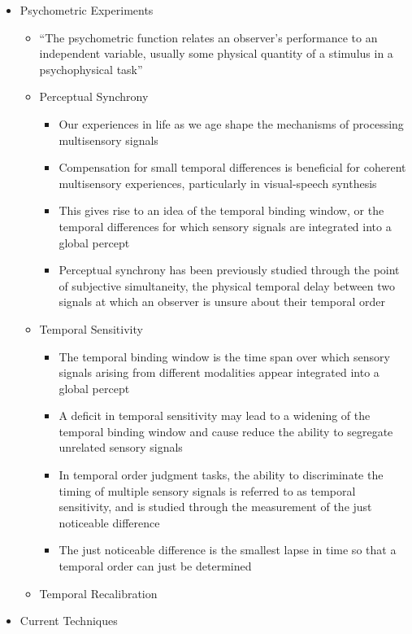 \documentclass[
]{article}
\providecommand{\tightlist}{%
  \setlength{\itemsep}{0pt}\setlength{\parskip}{0pt}}
\begin{document}
\begin{itemize}
\tightlist
\item
  Psychometric Experiments

  \begin{itemize}
  \tightlist
  \item
    ``The psychometric function relates an observer's performance to an independent variable, usually some physical quantity of a stimulus in a psychophysical task'' \citep{Wichmann2001a}
  \item
    Perceptual Synchrony

    \begin{itemize}
    \tightlist
    \item
      Our experiences in life as we age shape the mechanisms of processing multisensory signals
    \item
      Compensation for small temporal differences is beneficial for coherent multisensory experiences, particularly in visual-speech synthesis
    \item
      This gives rise to an idea of the temporal binding window, or the temporal differences for which sensory signals are integrated into a global percept
    \item
      Perceptual synchrony has been previously studied through the point of subjective simultaneity, the physical temporal delay between two signals at which an observer is unsure about their temporal order \citep{stone2001}
    \end{itemize}
  \item
    Temporal Sensitivity

    \begin{itemize}
    \tightlist
    \item
      The temporal binding window is the time span over which sensory signals arising from different modalities appear integrated into a global percept
    \item
      A deficit in temporal sensitivity may lead to a widening of the temporal binding window and cause reduce the ability to segregate unrelated sensory signals
    \item
      In temporal order judgment tasks, the ability to discriminate the timing of multiple sensory signals is referred to as temporal sensitivity, and is studied through the measurement of the just noticeable difference
    \item
      The just noticeable difference is the smallest lapse in time so that a temporal order can just be determined
    \end{itemize}
  \item
    Temporal Recalibration
  \end{itemize}
\item
  Current Techniques


\end{itemize}
\end{document}
